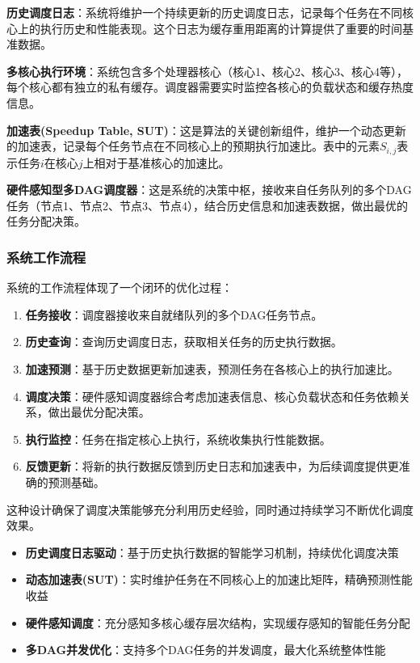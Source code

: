 \textbf{历史调度日志}：系统将维护一个持续更新的历史调度日志，记录每个任务在不同核心上的执行历史和性能表现。这个日志为缓存重用距离的计算提供了重要的时间基准数据。

\textbf{多核心执行环境}：系统包含多个处理器核心（核心1、核心2、核心3、核心4等），每个核心都有独立的私有缓存。调度器需要实时监控各核心的负载状态和缓存热度信息。

\textbf{加速表(Speedup Table, SUT)}：这是算法的关键创新组件，维护一个动态更新的加速表，记录每个任务节点在不同核心上的预期执行加速比。表中的元素$S_{i,j}$表示任务$i$在核心$j$上相对于基准核心的加速比。

\textbf{硬件感知型多DAG调度器}：这是系统的决策中枢，接收来自任务队列的多个DAG任务（节点1、节点2、节点3、节点4），结合历史信息和加速表数据，做出最优的任务分配决策。

\subsubsection{系统工作流程}

系统的工作流程体现了一个闭环的优化过程：

\begin{enumerate}
    \item \textbf{任务接收}：调度器接收来自就绪队列的多个DAG任务节点。
    \item \textbf{历史查询}：查询历史调度日志，获取相关任务的历史执行数据。
    \item \textbf{加速预测}：基于历史数据更新加速表，预测任务在各核心上的执行加速比。
    \item \textbf{调度决策}：硬件感知调度器综合考虑加速表信息、核心负载状态和任务依赖关系，做出最优分配决策。
    \item \textbf{执行监控}：任务在指定核心上执行，系统收集执行性能数据。
    \item \textbf{反馈更新}：将新的执行数据反馈到历史日志和加速表中，为后续调度提供更准确的预测基础。
\end{enumerate}

这种设计确保了调度决策能够充分利用历史经验，同时通过持续学习不断优化调度效果。



\begin{tcolorbox}[
    colback=blue!5!white,
    colframe=blue!50!black,
    title=\textbf{系统架构核心特性},
    fonttitle=\bfseries,
    arc=3pt
]
\begin{itemize}
    \item \textbf{历史调度日志驱动}：基于历史执行数据的智能学习机制，持续优化调度决策
    \item \textbf{动态加速表(SUT)}：实时维护任务在不同核心上的加速比矩阵，精确预测性能收益
    \item \textbf{硬件感知调度}：充分感知多核心缓存层次结构，实现缓存感知的智能任务分配
    \item \textbf{多DAG并发优化}：支持多个DAG任务的并发调度，最大化系统整体性能
\end{itemize}
\end{tcolorbox}

